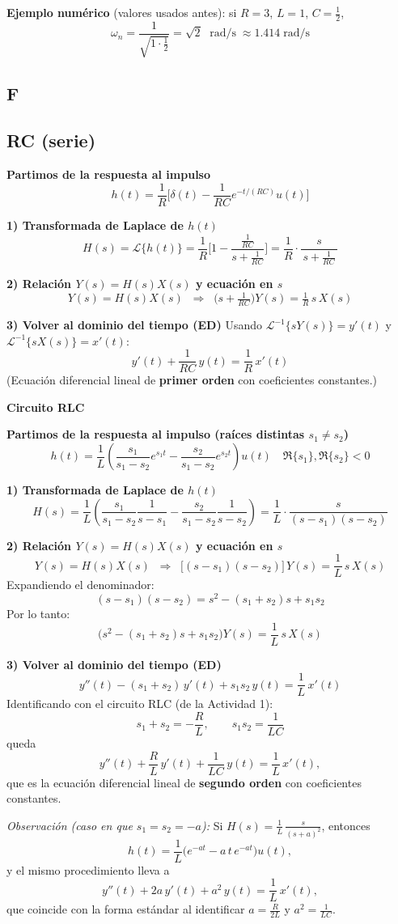 \textbf{Ejemplo numérico} (valores usados antes): si \(R=3\), \(L=1\), \(C=\tfrac{1}{2}\),
\[
\omega_n=\frac{1}{\sqrt{1\cdot \tfrac{1}{2}}}=\sqrt{2}\;\text{ rad/s}\;\approx 1.414\;\text{rad/s}
\]

\subsection{F}

\subsection*{RC (serie)}

\textbf{Partimos de la respuesta al impulso}
\[
h(t)=\frac{1}{R}\Big[\delta(t)-\frac{1}{RC}e^{-t/(RC)}u(t)\Big]
\]

\textbf{1) Transformada de Laplace de $h(t)$}
\[
H(s)=\mathscr{L}\{h(t)\}
=\frac{1}{R}\Big[1-\frac{\tfrac{1}{RC}}{s+\tfrac{1}{RC}}\Big]
=\frac{1}{R}\cdot\frac{s}{\,s+\tfrac{1}{RC}\,}
\]

\textbf{2) Relación $Y(s)=H(s)X(s)$ y ecuación en $s$}
\[
Y(s)=H(s)X(s)\;\;\Longrightarrow\;\;
\Big(s+\tfrac{1}{RC}\Big)Y(s)=\tfrac{1}{R}\,s\,X(s)
\]

\textbf{3) Volver al dominio del tiempo (ED)}
Usando \(\mathscr{L}^{-1}\{sY(s)\}=y'(t)\) y \(\mathscr{L}^{-1}\{sX(s)\}=x'(t)\):
\[
y'(t)+\frac{1}{RC}\,y(t)=\frac{1}{R}\,x'(t)
\]
(Ecuación diferencial lineal de \textbf{primer orden} con coeficientes constantes.)

\bigskip

\textbf{Circuito RLC}

\textbf{Partimos de la respuesta al impulso (raíces distintas $s_1\neq s_2$)}
\[
h(t)=\frac{1}{L}\left(\frac{s_1}{s_1-s_2}e^{s_1 t}
-\frac{s_2}{s_1-s_2}e^{s_2 t}\right)u(t)
\quad \Re\{s_1\},\Re\{s_2\}<0
\]

\textbf{1) Transformada de Laplace de $h(t)$}
\[
H(s)=\frac{1}{L}\left(\frac{s_1}{s_1-s_2}\frac{1}{s-s_1}
-\frac{s_2}{s_1-s_2}\frac{1}{s-s_2}\right)
=\frac{1}{L}\cdot\frac{s}{(s-s_1)(s-s_2)}
\]

\textbf{2) Relación $Y(s)=H(s)X(s)$ y ecuación en $s$}
\[
Y(s)=H(s)X(s)\;\;\Longrightarrow\;\;
\big[(s-s_1)(s-s_2)\big]\,Y(s)=\frac{1}{L}\,s\,X(s)
\]
Expandiendo el denominador:
\[
(s-s_1)(s-s_2)=s^2-(s_1+s_2)s+s_1 s_2
\]
Por lo tanto:
\[
\Big(s^2-(s_1+s_2)s+s_1 s_2\Big)Y(s)=\frac{1}{L}\,s\,X(s)
\]

\textbf{3) Volver al dominio del tiempo (ED)}
\[
y''(t)-(s_1+s_2)\,y'(t)+s_1 s_2\,y(t)=\frac{1}{L}\,x'(t)
\]
Identificando con el circuito RLC (de la Actividad 1): 
\[
s_1+s_2=-\frac{R}{L},\qquad s_1 s_2=\frac{1}{LC}
\]
queda
\[
y''(t)+\frac{R}{L}\,y'(t)+\frac{1}{LC}\,y(t)=\frac{1}{L}\,x'(t),
\]
que es la ecuación diferencial lineal de \textbf{segundo orden} con coeficientes constantes.

\medskip
\textit{Observación (caso en que $s_1=s_2=-a$):} 
Si $H(s)=\tfrac{1}{L}\,\tfrac{s}{(s+a)^2}$, entonces 
\[
h(t)=\frac{1}{L}\big(e^{-a t}-a\,t\,e^{-a t}\big)u(t),
\]
y el mismo procedimiento lleva a
\[
y''(t)+2a\,y'(t)+a^2\,y(t)=\frac{1}{L}\,x'(t),
\]
que coincide con la forma estándar al identificar \(a=\tfrac{R}{2L}\) y \(a^2=\tfrac{1}{LC}\).
